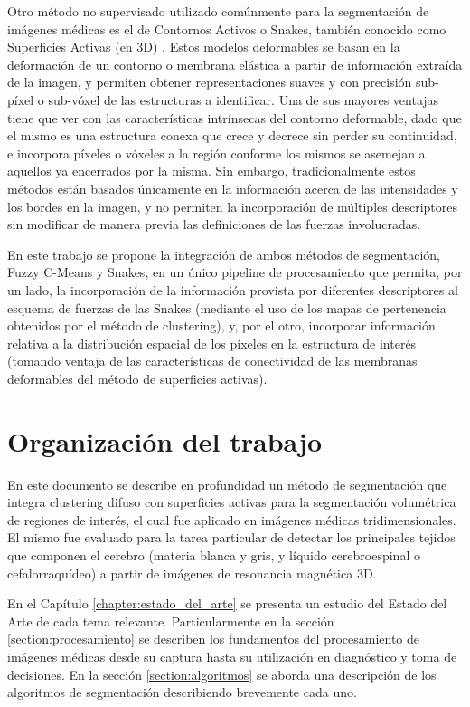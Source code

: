 Otro método no supervisado utilizado comúnmente para la segmentación de imágenes médicas es el de Contornos Activos o Snakes, también conocido como Superficies Activas (en 3D) \citep{mcinemey1999topology}. Estos modelos deformables se basan en la deformación de un contorno o membrana elástica a partir de información extraída de la imagen, y permiten obtener representaciones suaves y con precisión sub-píxel o sub-vóxel de las estructuras a identificar. Una de sus mayores ventajas tiene que ver con las características intrínsecas del contorno deformable, dado que el mismo es una estructura conexa que crece y decrece sin perder su continuidad, e incorpora píxeles o vóxeles a la región conforme los mismos se asemejan a aquellos ya encerrados por la misma. Sin embargo, tradicionalmente estos métodos están basados únicamente en la información acerca de las intensidades y los bordes en la imagen, y no permiten la incorporación de múltiples descriptores sin modificar de manera previa las definiciones de las fuerzas involucradas.

En este trabajo se propone la integración de ambos métodos de segmentación, Fuzzy C-Means y Snakes, en un único pipeline de procesamiento que permita, por un lado, la incorporación de la información provista por diferentes descriptores al esquema de fuerzas de las Snakes (mediante el uso de los mapas de pertenencia obtenidos por el método de clustering), y, por el otro, incorporar información relativa a la distribución espacial de los píxeles en la estructura de interés (tomando ventaja de las características de conectividad de las membranas deformables del método de superficies activas).
\section{Organización del trabajo}
En este documento se describe en profundidad un método de segmentación que integra clustering difuso con superficies activas para la segmentación volumétrica de regiones de interés, el cual fue aplicado en imágenes médicas tridimensionales. El mismo fue evaluado para la tarea particular de detectar los principales tejidos que componen el cerebro (materia blanca y gris, y líquido cerebroespinal o cefalorraquídeo) a partir de imágenes de resonancia magnética 3D.

En el Capítulo \ref{chapter:estado_del_arte} se presenta un estudio del Estado del Arte de cada tema relevante. Particularmente en la sección \ref{section:procesamiento} se describen los fundamentos del procesamiento de imágenes médicas desde su captura hasta su utilización en diagnóstico y toma de decisiones. En la sección \ref{section:algoritmos} se aborda una descripción de los algoritmos de segmentación describiendo brevemente cada uno.

